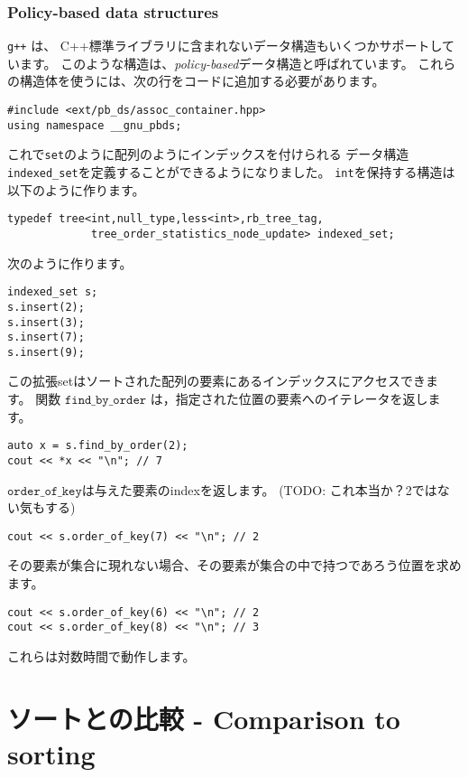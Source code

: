 \subsubsection{Policy-based data structures}

\texttt{g++} は、
C++標準ライブラリに含まれないデータ構造もいくつかサポートしています。
このような構造は、\emph{policy-based}データ構造と呼ばれています。
これらの構造体を使うには、次の行をコードに追加する必要があります。

\begin{lstlisting}
#include <ext/pb_ds/assoc_container.hpp>
using namespace __gnu_pbds; 
\end{lstlisting}

これで\texttt{set}のように配列のようにインデックスを付けられる
データ構造\texttt{indexed\_set}を定義することができるようになりました。
\texttt{int}を保持する構造は以下のように作ります。
\begin{lstlisting}
typedef tree<int,null_type,less<int>,rb_tree_tag,
             tree_order_statistics_node_update> indexed_set; 
\end{lstlisting}

次のように作ります。

\begin{lstlisting}
indexed_set s;
s.insert(2);
s.insert(3);
s.insert(7);
s.insert(9);
\end{lstlisting}

この拡張setはソートされた配列の要素にあるインデックスにアクセスできます。
関数 $\texttt{find\_by\_order}$ は，指定された位置の要素へのイテレータを返します。
\begin{lstlisting}
auto x = s.find_by_order(2);
cout << *x << "\n"; // 7
\end{lstlisting}

$\texttt{order\_of\_key}$は与えた要素のindexを返します。
(TODO: これ本当か？2ではない気もする)
\begin{lstlisting}
cout << s.order_of_key(7) << "\n"; // 2
\end{lstlisting}

その要素が集合に現れない場合、その要素が集合の中で持つであろう位置を求めます。
\begin{lstlisting}
cout << s.order_of_key(6) << "\n"; // 2
cout << s.order_of_key(8) << "\n"; // 3
\end{lstlisting}

これらは対数時間で動作します。

\section{ソートとの比較 - Comparison to sorting}

